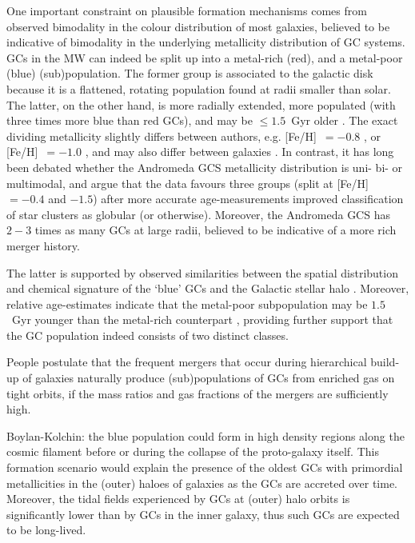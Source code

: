 \documentclass[a4paper,fleqn,usenatbib]{mnras}
\begin{document}
One important constraint on plausible formation mechanisms comes from observed 
bimodality in the colour distribution of most galaxies, believed to be indicative 
of bimodality in the underlying metallicity distribution of GC systems. GCs in
the MW can indeed be split up into a metal-rich (red), and a metal-poor (blue) 
(sub)population. The former group is associated to the galactic disk because it
is a flattened, rotating population found at radii smaller than solar. The latter,
on the other hand, is more radially extended, more populated (with three times
more blue than red GCs), and may be $\leq 1.5$~Gyr older \citep{2005AJ....130..116D}. 
The exact dividing metallicity slightly differs between authors, e.g.
[Fe/H]~$=-0.8$ \citep[according to][]{1985ApJ...293..424Z}, or
[Fe/H]~$=-1.0$ \citep[according to][]{Harris2001}, and may also differ between
galaxies \citep[e.g.][]{1985ApJ...293..424Z, 1999AJ....118.1526G, 2001AJ....121.2974L,
2006ApJ...639...95P}. In contrast, it has long been debated whether the Andromeda 
GCS metallicity distribution is uni- bi- or multimodal, and \citet{2016ApJ...824...42C}
argue that the data favours three groups (split at [Fe/H] $= -0.4$ and $-1.5$)
after more accurate age-measurements improved classification of star clusters
as globular (or otherwise). Moreover, the Andromeda GCS has $2-3$ times as many
GCs at large radii, believed to be indicative of a more rich merger history.


The latter is supported by observed similarities between the spatial distribution
and chemical signature of the `blue' GCs and the Galactic stellar halo 
\citep{2008A&ARv..15..145H}. Moreover, relative age-estimates indicate that the 
metal-poor subpopulation may be $1.5$~Gyr younger than the metal-rich counterpart 
\citep{2005AJ....130..116D}, providing further support that the GC population indeed
consists of two distinct classes.

People postulate that the frequent mergers that occur during hierarchical build-up 
of galaxies naturally produce (sub)populations of GCs from enriched gas on tight 
orbits, if the mass ratios and gas fractions of the mergers are sufficiently high.

Boylan-Kolchin: the blue population could form in high density regions along the 
cosmic filament before or during the collapse of the proto-galaxy itself.
This formation scenario would explain the presence of the oldest GCs with 
primordial metallicities in the (outer) haloes of galaxies as the GCs are
accreted over time. Moreover, the tidal fields experienced by GCs at (outer) halo
orbits is significantly lower than by GCs in the inner galaxy, thus such GCs
are expected to be long-lived.
\end{document}
